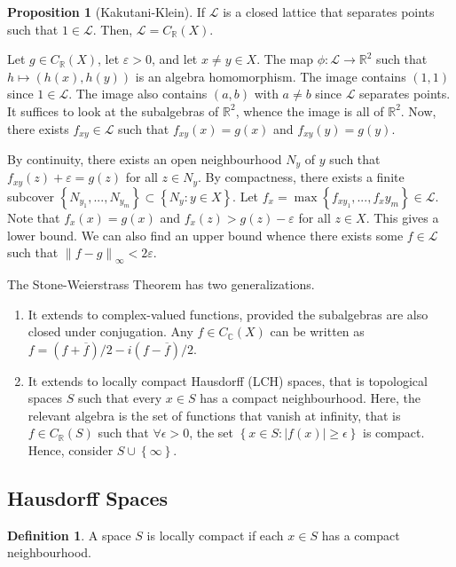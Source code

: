 \documentclass[11pt]{article}
\theoremstyle{definition}
\newtheorem{defn}[thm]{Definition}
\newtheorem{prop}[thm]{Proposition}
\newcommand{\set}[1]{\left\{ #1 \right\}}
\newcommand{\e}[0]{\varepsilon}
\newcommand{\abs}[1]{\left\lvert#1\right\rvert} %
\newcommand{\RR}{\mathbb{R}}
\newcommand{\CC}{\mathbb{C}}
\newcommand{\m}[1]{\mathcal{#1}}
\newcommand{\norm}[1]{\left\lVert#1\right\rVert} %
\begin{document}
\begin{prop}[Kakutani-Klein]
If $\m{L}$ is a closed lattice that separates points such that $1\in\m{L}$. Then,
$\m{L}=C_\RR(X)$.
\end{prop}
\proof
Let $g\in C_\RR(X)$, let $\e>0$, and let $x\neq y\in X$. The map $\phi:\m{L}\to\RR^2$ such
that $h\mapsto(h(x),h(y))$ is an algebra homomorphism. The image contains $(1,1)$ since
$1\in\m{L}$. The image also contains $(a,b)$ with $a\neq b$ since $\m{L}$ separates points.
It suffices to look at the subalgebras of $\RR^2$, whence the image is all of $\RR^2$. Now,
there exists $f_{xy}\in\m{L}$ such that $f_{xy}(x)=g(x)$ and $f_{xy}(y)=g(y)$.

By continuity, there exists an open neighbourhood $N_y$ of $y$ such that
$f_{xy}(z)+\e=g(z)$ for all $z\in N_y$. By compactness, there exists a finite subcover
$\set{N_{y_1},...,N_{y_m}}\subset\set{N_y:y\in X}$. Let
$f_x=\max\set{f_{xy_1},...,f_xy_m}\in\m{L}$. Note that $f_x(x)=g(x)$ and $f_x(z)>g(z)-\e$
for all $z\in X$. This gives a lower bound. We can also find an upper bound whence there
exists some $f\in\m{L}$ such that $\norm{f-g}_\infty<2\e$.
\qedhere




The Stone-Weierstrass Theorem has two generalizations.
\begin{enumerate}
\item It extends to complex-valued functions, provided the subalgebras are also closed
under conjugation. Any $f\in C_\CC(X)$ can be written as $f=(f+\overline{f})/2 -
i(f-\overline{f})/2$.
\item It extends to locally compact Hausdorff (LCH) spaces, that is topological spaces $S$
such that every $x\in S$ has a compact neighbourhood. Here, the relevant algebra is the set
of functions that vanish at infinity, that is $f\in C_\RR(S)$ such that
$\forall\epsilon>0$, the set $\set{x\in S:\abs{f(x)}\ge\epsilon}$ is compact. Hence,
consider $S\cup\set\infty$.
\end{enumerate}

\subsection{Hausdorff Spaces}

\begin{defn}
A space $S$ is locally compact if each $x\in S$ has a compact neighbourhood.
\end{defn}
\end{document}
